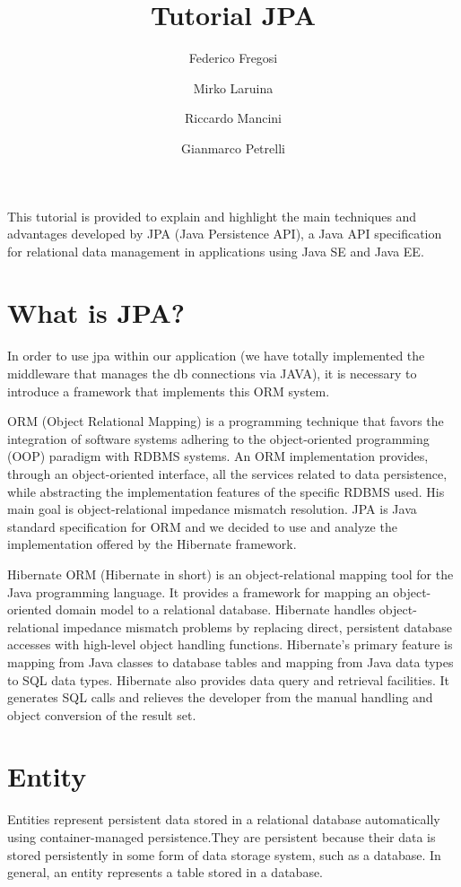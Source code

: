 \documentclass[a4paper]{article}
\begin{document}
\author{Federico Fregosi \and Mirko Laruina \and Riccardo Mancini \and Gianmarco Petrelli}
\title{Tutorial JPA}
\maketitle
\vspace{3cm}
\tableofcontents

\newpage
This tutorial is provided to explain and highlight the main techniques and advantages developed by JPA (Java Persistence API), a Java API specification for relational data management in applications using Java SE and Java EE.

\section{What is JPA?}
In order to use jpa within our application (we have totally implemented the middleware that manages the db connections via JAVA), it is necessary to introduce a framework that implements this ORM system.

ORM (Object Relational Mapping) is a programming technique that favors the integration of software systems adhering to the object-oriented programming (OOP) paradigm with RDBMS systems. An ORM implementation provides, through an object-oriented interface, all the services related to data persistence, while abstracting the implementation features of the specific RDBMS used. His main goal is object-relational impedance mismatch resolution. JPA is Java standard specification for ORM and we decided to use and analyze the implementation offered by the Hibernate framework.

Hibernate ORM (Hibernate in short) is an object-relational mapping tool for the Java programming language. It provides a framework for mapping an object-oriented domain model to a relational database. Hibernate handles object-relational impedance mismatch problems by replacing direct, persistent database accesses with high-level object handling functions.
Hibernate's primary feature is mapping from Java classes to database tables and mapping from Java data types to SQL data types. Hibernate also provides data query and retrieval facilities. It generates SQL calls and relieves the developer from the manual handling and object conversion of the result set.

\section{Entity}
Entities represent persistent data stored in a relational database automatically using container-managed persistence.They are persistent because their data is stored persistently in some form of data storage system, such as a database. In general, an entity represents a table stored in a database.
\end{document}
